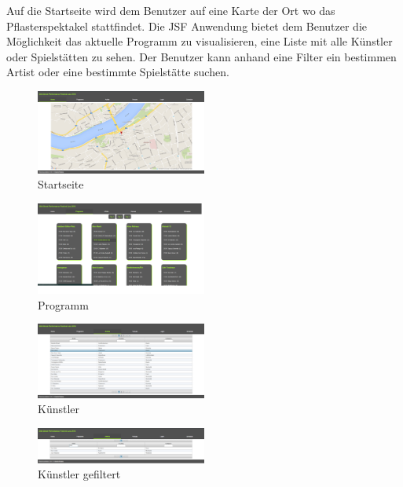 \documentclass[12pt, a4paper]{article}
\begin{document}
Auf die Startseite wird dem Benutzer auf eine Karte der Ort wo das Pflasterspektakel stattfindet. Die JSF Anwendung bietet dem Benutzer die Möglichkeit das aktuelle Programm zu visualisieren, eine Liste mit alle Künstler oder Spielstätten zu sehen. Der Benutzer kann anhand eine Filter ein bestimmen Artist oder eine bestimmte Spielstätte suchen. 

\begin{figure}[h] 	
	\centering
		\includegraphics[width=0.5\textwidth]{ClientHome.png}
	\caption{Startseite}
\end{figure}

\begin{figure}[h] 	
	\centering
		\includegraphics[width=0.5\textwidth]{ClientProgramm.png}
	\caption{Programm}
\end{figure}

\begin{figure}[h] 	
	\centering
		\includegraphics[width=0.5\textwidth]{ClientListArtists.png}
	\caption{Künstler}
\end{figure}

\begin{figure}[h] 	
	\centering
		\includegraphics[width=0.5\textwidth]{ClientListArtistsFilter.png}
	\caption{Künstler gefiltert}
\end{figure}
\end{document}
